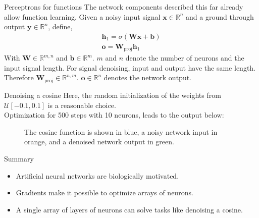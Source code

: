 \documentclass{beamer}
\begin{document}
    \begin{frame}{Perceptrons for functions}
      The network components described this far already allow function learning.
      Given a noisy input signal $\mathbf{x} \in \mathbb{R}^{n}$ and a ground through output $\mathbf{y} \in \mathbb{R}^n$,
      define,
      \begin{align}
        \mathbf{h}_1 = \sigma(\mathbf{W}\mathbf{x} + \mathbf{b}) \\
        \mathbf{o} = \mathbf{W}_{\text{proj}}\mathbf{h}_1
      \end{align}
      With $\mathbf{W} \in \mathbb{R}^{m,n}$ and $\mathbf{b} \in \mathbb{R}^{m}$.
      $m$ and $n$ denote the number of neurons and the input signal length.
      For signal denoising, input and output have the same length.
      Therefore $\mathbf{W}_{\text{proj}} \in \mathbb{R}^{n,m}$.
      $\mathbf{o} \in \mathbb{R}^{n}$ denotes the network output.
    \end{frame}


    \begin{frame}{Denoising a cosine}
			Here, the random initialization of the weights from $\mathcal{U}[-0.1, 0.1]$ is a reasonable choice.\\
      Optimization for 500 steps with 10 neurons, leads to the output below:
      \begin{figure}
        
        \caption{The cosine function is shown in blue, a noisy network input in orange, and a denoised network output in green.}
        \end{figure}
    \end{frame}

    \begin{frame}{Summary}
      \begin{itemize}
        \item Artificial neural networks are biologically motivated.
        \item Gradients make it possible to optimize arrays of neurons.
        \item A single array of layers of neurons can solve tasks like denoising a cosine.
      \end{itemize}
    \end{frame}
\end{document}
